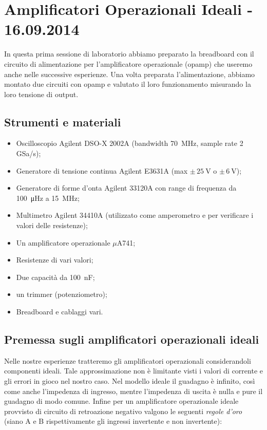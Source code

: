 \section{Amplificatori Operazionali Ideali - 16.09.2014}

In questa prima sessione di laboratorio abbiamo preparato la breadboard con il circuito di alimentazione per l'amplificatore operazionale (opamp) che useremo anche nelle successive esperienze.
Una volta preparata l'alimentazione, abbiamo montato due circuiti con opamp e valutato il loro funzionamento misurando la loro tensione di output.

\subsection*{Strumenti e materiali}

\begin{itemize} [noitemsep]
\item Oscilloscopio Agilent DSO-X 2002A (bandwidth \SI{70}{\mega\hertz}, sample rate \num{2} GSa/s);
\item Generatore di tensione continua Agilent E3631A (max $\pm \, \SI{25}{\volt}$ o $\pm \, \SI{6}{\volt}$);
\item Generatore di forme d'onta Agilent 33120A con range di frequenza da \SI{100}{\micro\hertz} a \SI{15}{\mega\hertz};
\item Multimetro Agilent 34410A (utilizzato come amperometro e per verificare i valori delle resistenze);
\item Un amplificatore operazionale $\mu$A741;
\item Resistenze di vari valori;
\item Due capacità da \SI{100}{\nano\farad};
\item un trimmer (potenziometro);
\item Breadboard e cablaggi vari.
\end{itemize}

\subsection{Premessa sugli amplificatori operazionali ideali}

Nelle nostre esperienze tratteremo gli amplificatori operazionali considerandoli componenti ideali. Tale approssimazione non è limitante visti i valori di corrente e gli errori in gioco nel nostro caso.
Nel modello ideale il guadagno è infinito, così come anche l'impedenza di ingresso, mentre l'impedenza di uscita è nulla e pure il guadagno di modo comune.
Infine per un amplificatore operazionale ideale provvisto di circuito di retroazione negativo valgono le seguenti \textit{regole d'oro} (siano A e B rispettivamente gli ingressi invertente e non invertente):

